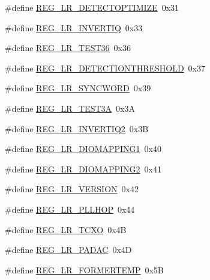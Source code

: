 \begin{DoxyCompactItemize}
\item 
\#define \mbox{\hyperlink{sx1276_regs-_lo_ra_8h_a62883b6ca8e236af4d331a31e55c67b3}{R\+E\+G\+\_\+\+L\+R\+\_\+\+D\+E\+T\+E\+C\+T\+O\+P\+T\+I\+M\+I\+ZE}}~0x31
\item 
\#define \mbox{\hyperlink{sx1276_regs-_lo_ra_8h_afc2779efc44625851e1d056f48fa1f0c}{R\+E\+G\+\_\+\+L\+R\+\_\+\+I\+N\+V\+E\+R\+T\+IQ}}~0x33
\item 
\#define \mbox{\hyperlink{sx1276_regs-_lo_ra_8h_a08173e8721d25c6ab32e8aa4c157751d}{R\+E\+G\+\_\+\+L\+R\+\_\+\+T\+E\+S\+T36}}~0x36
\item 
\#define \mbox{\hyperlink{sx1276_regs-_lo_ra_8h_abc835e71071bd5f3bd52f54168d6e4b7}{R\+E\+G\+\_\+\+L\+R\+\_\+\+D\+E\+T\+E\+C\+T\+I\+O\+N\+T\+H\+R\+E\+S\+H\+O\+LD}}~0x37
\item 
\#define \mbox{\hyperlink{sx1276_regs-_lo_ra_8h_a9da3702bd320fa729cb809d07ef0c38a}{R\+E\+G\+\_\+\+L\+R\+\_\+\+S\+Y\+N\+C\+W\+O\+RD}}~0x39
\item 
\#define \mbox{\hyperlink{sx1276_regs-_lo_ra_8h_a4dd28b78370d8732b9d149f71826e62d}{R\+E\+G\+\_\+\+L\+R\+\_\+\+T\+E\+S\+T3A}}~0x3A
\item 
\#define \mbox{\hyperlink{sx1276_regs-_lo_ra_8h_a83e2628ed2b5dcf9d0a30e7317b9a560}{R\+E\+G\+\_\+\+L\+R\+\_\+\+I\+N\+V\+E\+R\+T\+I\+Q2}}~0x3B
\item 
\#define \mbox{\hyperlink{sx1276_regs-_lo_ra_8h_a153226eac782c0908150527e844dc42f}{R\+E\+G\+\_\+\+L\+R\+\_\+\+D\+I\+O\+M\+A\+P\+P\+I\+N\+G1}}~0x40
\item 
\#define \mbox{\hyperlink{sx1276_regs-_lo_ra_8h_a13a4beabb022493d7f714e49e44e1715}{R\+E\+G\+\_\+\+L\+R\+\_\+\+D\+I\+O\+M\+A\+P\+P\+I\+N\+G2}}~0x41
\item 
\#define \mbox{\hyperlink{sx1276_regs-_lo_ra_8h_a8161394887fc1ff67af883e55afa006e}{R\+E\+G\+\_\+\+L\+R\+\_\+\+V\+E\+R\+S\+I\+ON}}~0x42
\item 
\#define \mbox{\hyperlink{sx1276_regs-_lo_ra_8h_af71d93b5478ef3e6058e3787a1095503}{R\+E\+G\+\_\+\+L\+R\+\_\+\+P\+L\+L\+H\+OP}}~0x44
\item 
\#define \mbox{\hyperlink{sx1276_regs-_lo_ra_8h_ab7ec38544ea3e38b672c3c786607b3ea}{R\+E\+G\+\_\+\+L\+R\+\_\+\+T\+C\+XO}}~0x4B
\item 
\#define \mbox{\hyperlink{sx1276_regs-_lo_ra_8h_a0fe80f278fb8bf0702faad66404d4a5c}{R\+E\+G\+\_\+\+L\+R\+\_\+\+P\+A\+D\+AC}}~0x4D
\item 
\#define \mbox{\hyperlink{sx1276_regs-_lo_ra_8h_a8eedbc42b755b17b123d3ecdb8d785b8}{R\+E\+G\+\_\+\+L\+R\+\_\+\+F\+O\+R\+M\+E\+R\+T\+E\+MP}}~0x5B

\end{DoxyCompactItemize}
